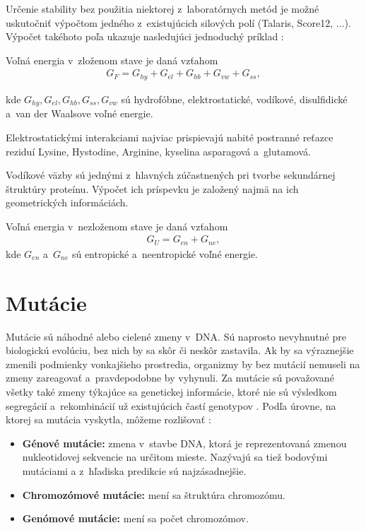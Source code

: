 Určenie stability bez použitia niektorej z~laboratórnych metód je možné uskutočniť výpočtom jedného z~existujúcich silových polí (Talaris, Score12, ...). Výpočet takéhoto poľa ukazuje nasledujúci jednoduchý príklad \cite{free_energy} \cite{gromiha}:

Voľná energia v~zloženom stave je daná vzťahom  
	\begin{align}
		G_{F} = G_{hy} + G_{el} + G_{hb} + G_{vw} + G_{ss},
	\end{align}

kde $G_{hy}, G_{el}, G_{hb}, G_{ss}, G_{vw}$ sú hydrofóbne, elektrostatické, vodíkové, disulfidické a~van der Waalsove voľné energie. 


Elektrostatickými interakciami najviac prispievajú nabité postranné reťazce reziduí Lysine, Hystodine, Arginine, kyselina asparagová a~glutamová.

Vodíkové väzby sú jednými z~hlavných zúčastnených pri tvorbe sekundárnej štruktúry proteínu. Výpočet ich príspevku je založený najmä na ich geometrických informáciách.

Voľná energia v~nezloženom stave je daná vzťahom
\begin{align}
	G_U = G_{en} + G_{ne},
\end{align}
kde $G_{en}$ a~$G_{ne}$ sú entropické a~neentropické voľné energie.


\section{Mutácie}
Mutácie sú náhodné alebo cielené zmeny v~DNA. Sú naprosto nevyhnutné pre biologickú evolúciu, bez nich by sa skôr či neskôr zastavila. Ak by sa výraznejšie zmenili podmienky vonkajšieho prostredia, organizmy by bez mutácií nemuseli na zmeny zareagovať a~pravdepodobne by vyhynuli. Za mutácie sú považované všetky také zmeny týkajúce sa genetickej informácie, ktoré nie sú výsledkom segregácií a~rekombinácií už existujúcich častí genotypov \cite{mutace}. 
Podľa úrovne, na ktorej sa mutácia vyskytla, môžeme rozlišovať \cite{flegr}:
\begin{itemize}
	\item \textbf{Génové mutácie:} zmena v~stavbe DNA, ktorá je reprezentovaná zmenou nukleotidovej sekvencie na určitom mieste. Nazývajú sa tiež bodovými mutáciami a z~hľadiska predikcie sú najzásadnejšie.
	\item \textbf{Chromozómové mutácie:} mení sa štruktúra chromozómu.
	\item \textbf{Genómové mutácie:} mení sa počet chromozómov.
\end{itemize}

